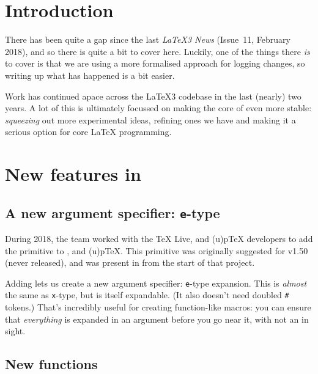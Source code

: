 \documentclass{ltnews}
\begin{document}
\maketitle

\tableofcontents

\section{Introduction}

There has been quite a gap since the last \emph{\LaTeX3 News} (Issue~11,
February 2018), and so there is quite a bit to cover here. Luckily, one of the
things there \emph{is} to cover is that we are using a more formalised approach
for logging changes, so writing up what has happened is a bit easier.

Work has continued apace across the \LaTeX3 codebase in the last (nearly) two
years. A lot of this is ultimately focussed on making the core of 
even more stable: \emph{squeezing} out more experimental ideas, refining
ones we have and making it a serious option for core \LaTeX{} programming.

\section{New features in }

\subsection{A new argument specifier: \texttt{e}-type}

During 2018, the team worked with the \TeX{} Live,  and
(u)p\TeX{} developers to add the  primitive to ,
 and (u)p\TeX{}. This primitive was originally suggested for
 v1.50 (never released), and was present in 
from the start of that project.

Adding  lets us create a new argument specifier: \texttt{e}-type
expansion. This is \emph{almost} the same as \texttt{x}-type, but is itself
expandable. (It also doesn't need doubled \verb|#| tokens.) That's incredibly
useful for creating function-like macros: you can ensure that \emph{everything}
is expanded in an argument before you go near it, with not an 
in sight.

\subsection{New functions}
\end{document}
